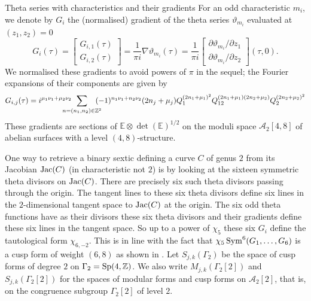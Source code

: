 \documentclass[12pt]{amsart}
\numberwithin{equation}{section}
\newcommand{\EE}{\mathbb E}
\newcommand{\ZZ}{\mathbb Z}
\numberwithin{equation}{section}
\theoremstyle{definition}
\theoremstyle{remark}
\begin{document}
\begin{section}{Theta series with characteristics and their gradients}
For an odd characteristic $m_i$, we denote by $G_i$ the (normalised) gradient of the theta series $\vartheta_{m_i}$ evaluated at $(z_1,z_2)=0$
\begin{equation}\label{GradTheta}
G_i(\tau)=
\left[\begin{smallmatrix} 
G_{i,1}(\tau)\\G_{i,2}(\tau)
\end{smallmatrix}\right]=
\frac{1}{\pi i}\nabla\vartheta_{m_i}(\tau)=
\frac{1}{\pi i}\left[\begin{smallmatrix} 
\partial \vartheta_{m_i} /\partial z_1\\
\partial \vartheta_{m_i} /\partial z_2
\end{smallmatrix}\right](\tau,0).
\end{equation}
We normalised these gradients to avoid powers of $\pi$ in the sequel; the Fourier expansions of their components are given by
 \begin{equation}\label{FE_Odd_Theta}
G_{i,j}(\tau)= i^{\mu_1\nu_1+\mu_2\nu_2}
\hspace{-14pt}
\sum_{n=(n_1,n_2)\in {\ZZ}^2}
\hspace{-8pt}
(-1)^{n_1\nu_1+n_2\nu_2}
(2n_j+\mu_j)
Q_1^{(2n_1+\mu_1)^2}
Q_{12}^{(2n_1+\mu_1)(2n_2+\mu_2)}
Q_2^{(2n_2+\mu_2)^2}
\end{equation}
These gradients are sections of ${\EE}\otimes \det({\EE})^{1/2}$ on the moduli space
$\mathcal{A}_2[4,8]$ of abelian surfaces with a level $(4,8)$-structure.

\bigskip

One way to retrieve a binary sextic defining a curve $C$ of genus $2$ from its Jacobian ${\rm Jac}(C)$ 
(in characteristic not $2$)
is by looking at the sixteen symmetric theta divisors on ${\rm Jac}(C)$.
There are precisely six such theta divisors passing through the origin. The tangent lines
to these six theta divisors define six lines in the $2$-dimensional tangent space
to ${\rm Jac}(C)$ at the origin. The six odd theta functions have as their divisors
these six theta divisors and their gradients define these six lines in the tangent space.
So up to a power of $\chi_5$ these six $G_i$ define the tautological form $\chi_{6,-2}$.
This is in line with the fact that $\chi_5\,  {\rm Sym}^6(G_1,\ldots,G_6)$ is a cusp form of weight $(6,8)$
as shown in \cite{CvdGG}. Let $S_{j,k}(\Gamma_2)$ be the space of cusp forms of degree $2$
on $\Gamma_2={\rm Sp}(4,{\ZZ})$. We also write $M_{j,k}(\Gamma_2[2])$ and $S_{j,k}(\Gamma_2[2])$
for the spaces of modular forms and cusp forms on $\mathcal{A}_2[2]$, that is, on the congruence subgroup
$\Gamma_2[2]$ of level $2$.


\end{section}
\end{document}
